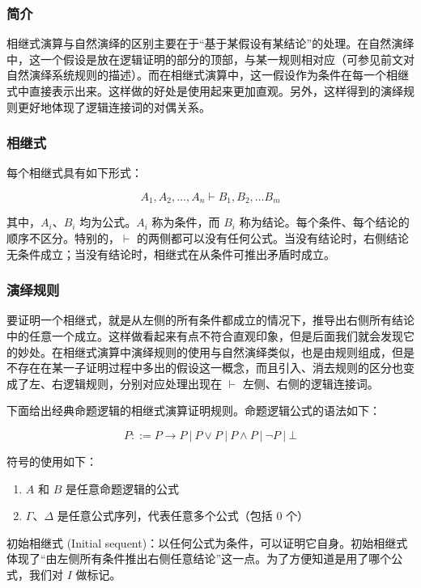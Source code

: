 \subsubsection{简介}

相继式演算与自然演绎的区别主要在于“基于某假设有某结论”的处理。在自然演绎中，这一个假设是放在逻辑证明的部分的顶部，与某一规则相对应（可参见前文对自然演绎系统规则的描述）。而在相继式演算中，这一假设作为条件在每一个相继式中直接表示出来。这样做的好处是使用起来更加直观。另外，这样得到的演绎规则更好地体现了逻辑连接词的对偶关系。

\subsubsection{相继式}

每个相继式具有如下形式：

\[ A_1, A_2, \dots, A_n \vdash B_1, B_2, \dots B_m\]

其中，$A_i$、$B_i$ 均为公式。$A_i$ 称为条件，而 $B_i$ 称为结论。每个条件、每个结论的顺序不区分。特别的，$\vdash$ 的两侧都可以没有任何公式。当没有结论时，右侧结论无条件成立；当没有结论时，相继式在从条件可推出矛盾时成立。

\subsubsection{演绎规则}

要证明一个相继式，就是从左侧的所有条件都成立的情况下，推导出右侧所有结论中的任意一个成立。这样做看起来有点不符合直观印象，但是后面我们就会发现它的妙处。在相继式演算中演绎规则的使用与自然演绎类似，也是由规则组成，但是不存在在某一子证明过程中多出的假设这一概念，而且引入、消去规则的区分也变成了左、右逻辑规则，分别对应处理出现在 $\vdash$ 左侧、右侧的逻辑连接词。

下面给出经典命题逻辑的相继式演算证明规则。命题逻辑公式的语法如下：

\[ P ::= P \rightarrow P\ |\ P \vee P\ |\ P \wedge P\ |\ \neg P\ |\ \bot \]

符号的使用如下：

\begin{enumerate}
\item $A$ 和 $B$ 是任意命题逻辑的公式
\item $\Gamma$、$\Delta$ 是任意公式序列，代表任意多个公式（包括 0 个）
\end{enumerate}

初始相继式 (Initial sequent)：以任何公式为条件，可以证明它自身。初始相继式体现了“由左侧所有条件推出右侧任意结论”这一点。为了方便知道是用了哪个公式，我们对 $I$ 做标记。

